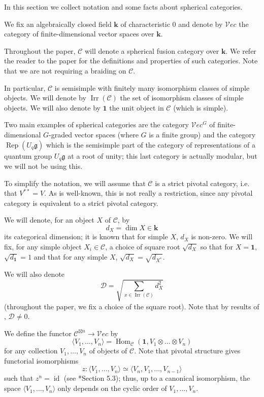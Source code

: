 \documentclass{amsart}
\theoremstyle{definition}
\theoremstyle{remark}
\numberwithin{equation}{section}
\newcommand{\<}{\langle}
\renewcommand{\>}{\rangle}
\newcommand{\one}{\mathbf{1}}
\newcommand{\kk}{\mathbf{k}}       %
\newcommand{\DD}{\mathcal{D}}      %
\newcommand{\C}{\mathcal{C}}      %
\newcommand{\Vect}{\mathcal{V}ec}  %
\newcommand{\VecG}{\mathcal{V}ec^G}  %
\newcommand{\g}{\mathfrak{g}}                  %
\DeclareMathOperator{\Rep}{Rep}
\DeclareMathOperator{\Irr}{Irr}
\DeclareMathOperator{\id}{id}
\DeclareMathOperator{\Hom}{Hom}
\begin{document}
In this section we collect notation and some facts about spherical
categories.

We fix   an algebraically  closed field  $\kk$ of characteristic 0 and
 denote by $\Vect$ the category of finite-dimensional vector spaces over
$\kk$.

Throughout the paper, $\C$ will denote a spherical fusion category over 
 $\kk$. We refer the reader
to the paper  for the definitions and properties of such
categories. Note that we are not requiring a braiding on $\C$. 

In particular, $\C$ is semisimple with finitely many
isomorphism classes of simple objects. We will denote by $\Irr(\C)$ the
set of isomorphism classes of simple objects. We will also denote by $\one$
the unit object in $\C$ (which is simple).


Two main examples of spherical categories are the category $\VecG$ of
finite-dimensional $G$-graded vector spaces (where $G$ is a finite group)
and the category $\Rep(U_q\g)$ which is the semisimple part  of the
category of representations of a quantum group $U_q\g$ at a root of unity;
this last category is actually modular, but we will not be using this. 




To simplify the notation, we will assume that $\C$ is a strict pivotal
category, i.e. that $V^{**}=V$. As is well-known, this is not really a
restriction, since any pivotal category is equivalent to a strict pivotal
category.


We will denote, for an object $X$ of $\C$, by 
$$
d_X=\dim X\in \kk
$$
its categorical dimension; it is known that for simple $X$, $d_X$ is
non-zero. We will fix, for any simple object $X_i\in \C$, a choice of
square root $\sqrt{d_X}$ so that for $X=\one$, $\sqrt{d_\one}=1$ and that
for any simple $X$, $\sqrt{d_X}=\sqrt{d_{X^*}}$. 

We will also denote
\begin{equation}\label{e:DD}
\DD=\sqrt{\sum_{x\in \Irr(\C)}d_X^2}
\end{equation}
(throughout the paper, we fix a choice of the square root). Note that by
results of , $\DD\ne 0$. 



We define the
functor $\C^{\boxtimes n}\to \Vect$ by 
\begin{equation}\label{e:vev}
 \<V_1,\dots,V_n\>=\Hom_\C(\one, V_1\otimes\dots\otimes V_n)
\end{equation}
for any collection $V_1,\dots, V_n$ of objects of $\C$. Note that pivotal
structure gives functorial isomorphisms 
\begin{equation}\label{e:cyclic}
 z\colon\<V_1,\dots,V_n\>\simeq \<V_n, V_1,\dots,V_{n-1}\>
\end{equation}
such that $z^n=\id$ (see *{Section 5.3}); thus, up to a canonical
isomorphism,
the space $\<V_1,\dots,V_n\>$ only depends on the cyclic order of
$V_1,\dots, V_n$. 
\end{document}
